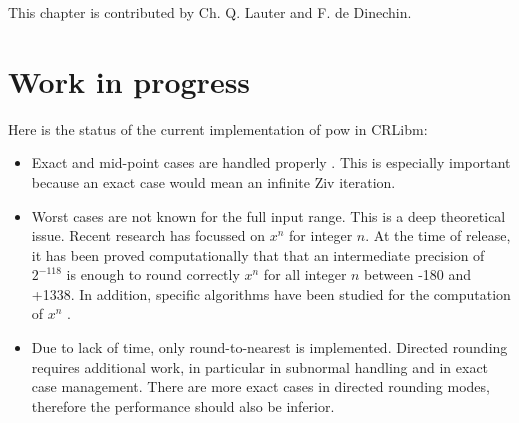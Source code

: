 This chapter is contributed by Ch. Q. Lauter and F. de Dinechin.




\section{Work in progress}

Here is the status of the current implementation of pow in CRLibm:

\begin{itemize}
\item Exact and mid-point cases are handled properly
  \cite{LauterLefevre2007}. This is especially important because an
  exact case would mean an infinite Ziv iteration.

\item Worst cases are not known for the full input range. This is a
  deep theoretical issue. Recent research has focussed on $x^n$ for
  integer $n$. At the time of release, it has been proved
  computationally that that an intermediate precision of $2^{-118}$ is
  enough to round correctly $x^n$ for all integer $n$ between -180 and
  +1338. In addition, specific algorithms have been studied for the
  computation of $x^n$ \cite{KorLauLefLouvMul2008}.

\item Due to lack of time, only round-to-nearest is
  implemented. Directed rounding requires additional work, in
  particular in subnormal handling and in exact case management. There
  are more exact cases in directed rounding modes, therefore the
  performance should also be inferior.


\end{itemize}
